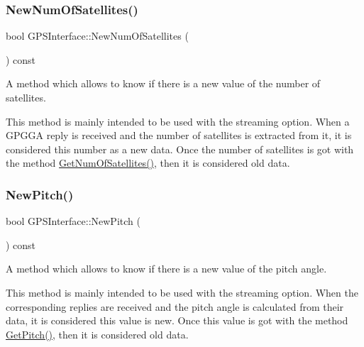 \subsubsection{\texorpdfstring{New\+Num\+Of\+Satellites()}{NewNumOfSatellites()}}
{\footnotesize\ttfamily bool G\+P\+S\+Interface\+::\+New\+Num\+Of\+Satellites (\begin{DoxyParamCaption}{ }\end{DoxyParamCaption}) const\hspace{0.3cm}{\ttfamily [inline]}}



A method which allows to know if there is a new value of the number of satellites. 

This method is mainly intended to be used with the streaming option. When a G\+P\+G\+GA reply is received and the number of satellites is extracted from it, it is considered this number as a new data. Once the number of satellites is got with the method \hyperlink{classGPSInterface_acfacca3208f482716bf3408f9ba04aff}{Get\+Num\+Of\+Satellites()}, then it is considered old data. \mbox{\label{classGPSInterface_ab0f5da64a7320e246bc49fa869f498f5}} 
\subsubsection{\texorpdfstring{New\+Pitch()}{NewPitch()}}
{\footnotesize\ttfamily bool G\+P\+S\+Interface\+::\+New\+Pitch (\begin{DoxyParamCaption}{ }\end{DoxyParamCaption}) const\hspace{0.3cm}{\ttfamily [inline]}}



A method which allows to know if there is a new value of the pitch angle. 

This method is mainly intended to be used with the streaming option. When the corresponding replies are received and the pitch angle is calculated from their data, it is considered this value is new. Once this value is got with the method \hyperlink{classGPSInterface_afbea020a31dde632a8e7c6f1595eedf6}{Get\+Pitch()}, then it is considered old data. \mbox{\label{classGPSInterface_a88d33d42e29b20e62619fc5c217868ae}} 
